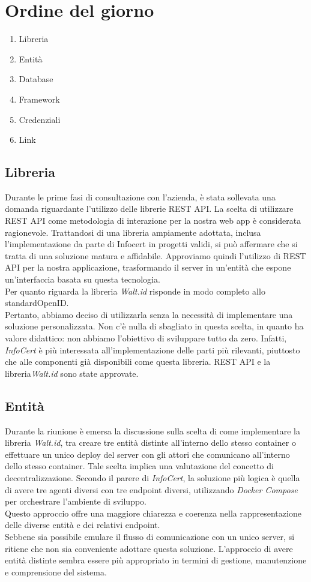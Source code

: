 \section{Ordine del giorno}
\begin{enumerate}
\item Libreria
\item Entità
\item Database
\item Framework 
\item Credenziali
\item Link
\end{enumerate}

\subsection{Libreria}
Durante le prime fasi di consultazione con l'azienda, è stata sollevata una domanda riguardante l'utilizzo delle librerie REST API. 
La scelta di utilizzare REST API come metodologia di interazione per la nostra web app è considerata ragionevole. 
Trattandosi di una libreria ampiamente adottata, inclusa l'implementazione da parte di Infocert in progetti validi, si può affermare che si tratta di 
una soluzione matura e affidabile. Approviamo quindi l'utilizzo di REST API per la nostra applicazione, trasformando il server in un'entità che espone 
un'interfaccia basata su questa tecnologia. \\Per quanto riguarda la libreria \textit{Walt.id} risponde in modo completo allo standardOpenID.\\
Pertanto, abbiamo deciso di utilizzarla senza la necessità di implementare una soluzione personalizzata. 
Non c'è nulla di sbagliato in questa scelta, in quanto ha valore didattico: non abbiamo l'obiettivo di sviluppare tutto da zero. 
Infatti, \textit{InfoCert} è più interessata all'implementazione delle parti più rilevanti, piuttosto che alle componenti già disponibili come questa libreria.
REST API e  la libreria\textit{Walt.id} sono state approvate.

\subsection{Entità}
Durante la riunione è emersa la discussione sulla scelta di come implementare la libreria \textit{Walt.id}, tra creare tre entità distinte all'interno dello stesso container o effettuare un unico deploy 
del server con gli attori che comunicano all'interno dello stesso container. Tale scelta implica una valutazione del concetto di decentralizzazione.
Secondo il parere di \textit{InfoCert}, la soluzione più logica è quella di avere tre agenti diversi con tre endpoint diversi, 
utilizzando \textit{Docker Compose} per orchestrare l'ambiente di sviluppo.\\
Questo approccio offre una maggiore chiarezza e coerenza nella rappresentazione 
delle diverse entità e dei relativi endpoint.\\
Sebbene sia possibile emulare il flusso di comunicazione con un unico server, 
si ritiene che non sia conveniente adottare questa soluzione. L'approccio di avere entità distinte sembra essere più appropriato in termini di gestione, 
manutenzione e comprensione del sistema.

